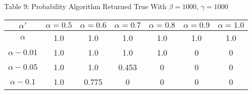 \documentclass{article}
\begin{document}
\begin{center}
Table 9: Probability Algorithm Returned True With $\beta=1000$, $\gamma=1000$ \\
\begin{tabular}{|c|c|c|c|c|c|c|}
\hline
$\alpha'$ & $\alpha = 0.5$ & $\alpha = 0.6$ & $\alpha = 0.7$ & $\alpha = 0.8$ & $\alpha = 0.9$ & $\alpha = 1.0$ \\
\hline
$\alpha$ & 1.0 & 1.0 & 1.0 & 1.0 & 1.0 & 1.0 \\
\hline
$\alpha-0.01$ & 1.0 & 1.0 & 1.0 & 1.0 & 0 & 0 \\
\hline
$\alpha-0.05$ & 1.0 & 1.0 & 0.453 & 0 & 0 & 0 \\
\hline
$\alpha-0.1$ & 1.0 & 0.775 & 0 & 0 & 0 & 0 \\
\hline
\end{tabular}
\end{center}
\end{document}
